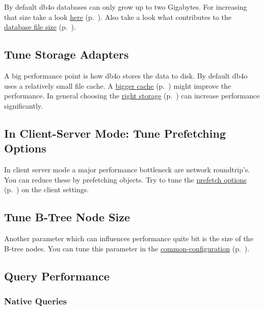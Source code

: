 By default db4o databases can only grow up to two Gigabytes. For increasing that size take a look \hyperref[ref:troubleshoot-increasing-the-maximum-database-file-size]{here} (p.~\pageref{ref:troubleshoot-increasing-the-maximum-database-file-size}). Also take a look what contributes to the \hyperref[ref:troubleshoot-database-size]{database file size} (p.~\pageref{ref:troubleshoot-database-size}).

\subsection*{Tune Storage Adapters}

A big performance point is how db4o stores the data to disk. By default db4o uses a relatively small file cache. A \hyperref[ref:configuration-file-storage-cachingstorage]{bigger cache} (p.~\pageref{ref:configuration-file-storage-cachingstorage}) might improve the performance. In general choosing the \hyperref[ref:configuration-file-storage]{right storage} (p.~\pageref{ref:configuration-file-storage}) can increase performance significantly.

\subsection*{In Client-Server Mode: Tune Prefetching Options}

In client server mode a major performance bottleneck are network roundtrip's. You can reduce these by prefetching objects. Try to tune the \hyperref[ref:configuration-client-configuration]{prefetch options} (p.~\pageref{ref:configuration-client-configuration}) on the client settings.

\subsection*{Tune B-Tree Node Size}

Another parameter which can influences performance quite bit is the size of the B-tree nodes. You can tune this parameter in the \hyperref[ref:configuration-common-btree-node-size]{common-configuration} (p.~\pageref{ref:configuration-common-btree-node-size}).

\subsection{Query Performance}
\label{ref:troubleshoot-queries}

\subsubsection*{Native Queries}

